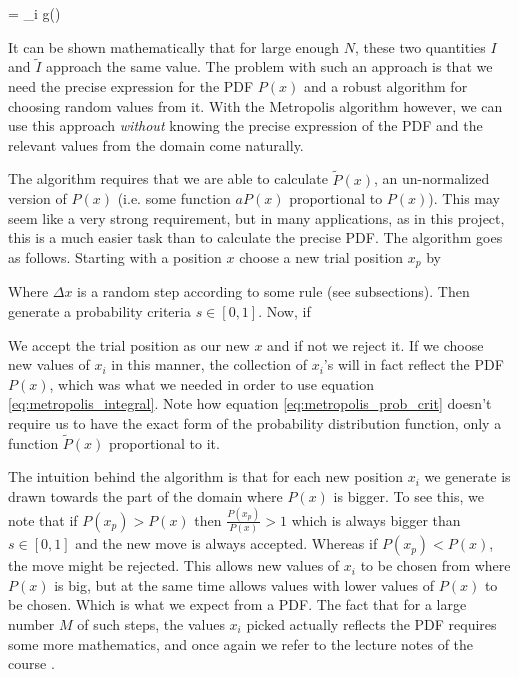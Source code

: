 \eqs
{} =  \sum_i g()
\label{eq:metropolis_integral}
\eqf

It can be shown mathematically that for large enough $N$, these two quantities $I$ and $\tilde{I}$ approach the same value.  
The problem with such an approach is that we need the precise expression for the PDF $P(x)$ and a robust algorithm for choosing random values from it. 
With the Metropolis algorithm however, we can use this approach \textit{without} knowing the precise expression of the PDF and the relevant values from the domain come naturally. 

The algorithm requires that we are able to calculate $\tilde{P}(x)$, an un-normalized version of $P(x)$ (i.e. some function $aP(x)$ proportional to $P(x)$). 
This may seem like a very strong requirement, but in many applications, as in this project, this is a much easier task than to calculate the precise PDF. 
The algorithm goes as follows. 
Starting with a position $x$ choose a new trial position  $x_p$ by

\eqs {} \eqf

Where $\Delta x$ is a random step according to some rule (see subsections).
Then generate a probability criteria $s \in [0,1]$.
Now, if

\eqs 
{}
\eqf

We accept the trial position as our new $x$ and if not we reject it. 
If we choose new values of $x_i$ in this manner, the collection of $x_i$'s will in fact reflect the PDF $P(x)$, which was what we needed in order to use equation \ref{eq:metropolis_integral}. 
Note how equation \ref{eq:metropolis_prob_crit} doesn't require us to have the exact form of the probability distribution function, only a function $\tilde{P}(x)$ proportional to it. 

The intuition behind the algorithm is that for each new position $x_i$ we generate is drawn towards the part of the domain where $P(x)$ is bigger. 
To see this, we note that if $P(x_p) > P(x)$ then $\frac{P(x_p)}{P(x)}>1$ which is always bigger than $s \in [0,1]$ and the new move is always accepted.
Whereas if $P(x_p)<P(x)$, the move might be rejected. 
This allows new values of $x_i$ to be chosen from where $P(x)$ is big, but at the same time allows values with lower values of $P(x)$ to be chosen. 
Which is what we expect from a PDF. 
The fact that for a large number $M$ of such steps, the values $x_i$ picked actually reflects the PDF requires some more mathematics, and once again we refer to the lecture notes of the course \cite{lecturenotes}.




